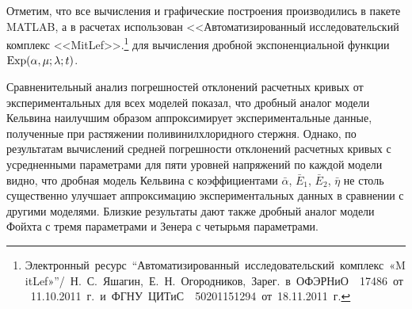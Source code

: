 Отметим, что все вычисления и графические построения производились в пакете MATLAB, а в расчетах использован <<Автоматизированный исследовательский комплекс
\mbox{<<MitLef>>.\footnote{Электронный ресурс ``Автоматизированный исследовательский комплекс «MitLef»''/ Н.~С.~Яшагин, Е.~Н.~Огородников,
Зарег. в ОФЭРНиО \No~17486 от 11.10.2011~г. и ФГНУ ЦИТиС \No~50201151294 от 18.11.2011~г.}}
для вычисления дробной экспоненциальной функции ${\rm Exp}(\alpha,\mu;\lambda;t)$.



\smallskip



Сравненительный анализ погрешностей отклонений расчетных кривых от экспериментальных для всех моделей показал, что дробный аналог модели Кельвина наилучшим образом аппроксимирует экспериментальные данные, полученные при растяжении поливинилхлоридного стержня. Однако, по результатам вычислений средней погрешности отклонений расчетных кривых с усредненными параметрами для пяти уровней напряжений по каждой модели видно, что дробная модель Кельвина с коэффициентами $\bar{\alpha}$, $\bar{E}_{1}$, $\bar{E}_{2}$, $\bar{\eta}$ не столь существенно
улучшает аппроксимацию экспериментальных данных в сравнении с другими моделями. Близкие результаты дают также дробный аналог модели Фойхта с тремя параметрами и Зенера с четырьмя параметрами.















\smallskip

